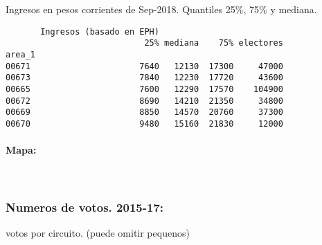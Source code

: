\documentclass[11pt]{article}
\begin{document}
    
    Ingresos en pesos corrientes de Sep-2018. Quantiles 25\%, 75\% y
mediana.

    
    
    \begin{verbatim}
       Ingresos (basado en EPH)                         
                            25% mediana    75% electores
area_1                                                  
00671                      7640   12130  17300     47000
00673                      7840   12230  17720     43600
00665                      7600   12290  17570    104900
00672                      8690   14210  21350     34800
00669                      8850   14570  20760     37300
00670                      9480   15160  21830     12000
    \end{verbatim}

    
    \hypertarget{mapa}{%
\paragraph{Mapa:}\label{mapa}}

    
    \begin{center}
    \end{center}
    { \hspace*{\fill} \\}
    
    \hypertarget{numeros-de-votos.-2015-17}{%
\subsubsection{Numeros de votos.
2015-17:}\label{numeros-de-votos.-2015-17}}

    
    votos por circuito. (puede omitir pequenos)

    
    
\end{document}
